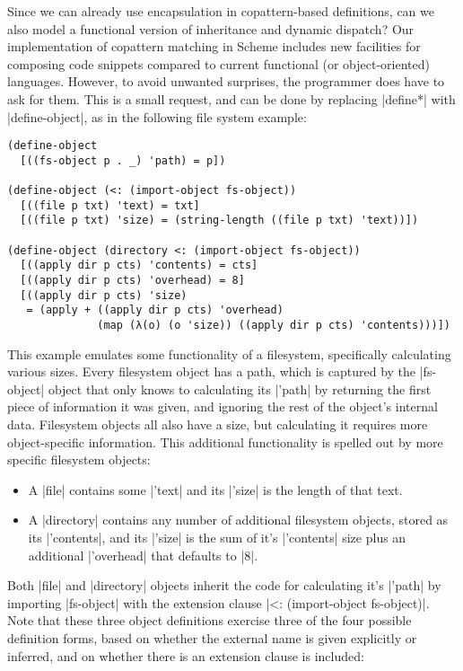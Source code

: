 Since we can already use encapsulation in copattern-based definitions, can we also model a functional version \cite{Brown2009FunctionI} of inheritance and dynamic dispatch?
Our implementation of copattern matching in Scheme includes new facilities for composing code snippets compared to current functional (or object-oriented) languages.
However, to avoid unwanted surprises, the programmer does have to ask for them.
This is a small request, and can be done by replacing \scm|define*| with \scm|define-object|, as in the following file system example:
\begin{verbatim}
(define-object
  [((fs-object p . _) 'path) = p])

(define-object (<: (import-object fs-object))
  [((file p txt) 'text) = txt]
  [((file p txt) 'size) = (string-length ((file p txt) 'text))])

(define-object (directory <: (import-object fs-object))
  [((apply dir p cts) 'contents) = cts]
  [((apply dir p cts) 'overhead) = 8]
  [((apply dir p cts) 'size)
   = (apply + ((apply dir p cts) 'overhead)
              (map (λ(o) (o 'size)) ((apply dir p cts) 'contents)))])
\end{verbatim}
This example emulates some functionality of a filesystem, specifically calculating various sizes.
Every filesystem object has a path, which is captured by the \scm|fs-object| object that only knows to calculating its \scm|'path| by returning the first piece of information it was given, and ignoring the rest of the object's internal data.
Filesystem objects all also have a size, but calculating it requires more object-specific information.
This additional functionality is spelled out by more specific filesystem objects:
\begin{itemize}
\item A \scm|file| contains some \scm|'text| and its \scm|'size| is the length of that text.
\item A \scm|directory| contains any number of additional filesystem objects, stored as its \scm|'contents|, and its \scm|'size| is the sum of it's \scm|'contents| size plus an additional \scm|'overhead| that defaults to \scm|8|.
\end{itemize}
Both \scm|file| and \scm|directory| objects inherit the code for calculating it's \scm|'path| by importing \scm|fs-object| with the extension clause \scm|<: (import-object fs-object)|.
Note that these three object definitions exercise three of the four possible definition forms, based on whether the external name is given explicitly or inferred, and on whether there is an extension clause is included:
